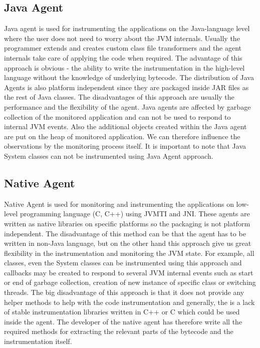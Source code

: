\subsection{Java Agent}
Java agent is used for instrumenting the applications on the Java-language level where the user does not need to worry about the JVM internals. Usually the programmer extends and creates custom class file transformers and the agent internals take care of applying the code when required. The advantage of this approach is obvious - the ability to write the instrumentation in the high-level language without the knowledge of underlying bytecode. The distribution of Java Agents is also platform independent since they are packaged inside JAR files as the rest of Java classes. The disadvantages of this approach are usually the performance and the flexibility of the agent. Java agents are affected by garbage collection of the monitored application and can not be used to respond to internal JVM events. Also the additional objects created within the Java agent are put on the heap of monitored application. We can therefore influence the observations by the monitoring process itself. It is important to note that Java System classes can not be instrumented using Java Agent approach.
\subsection{Native Agent}
Native Agent is used for monitoring and instrumenting the applications on low-level programming language (C, C++) using JVMTI and JNI. These agents are written as native libraries on specific platforms so the packaging is not platform independent. The disadvantage of this method can be that the agent has to be written in non-Java language, but on the other hand this approach give us great flexibility in the instrumentation and monitoring the JVM state. For example, all classes, even the System classes can be instrumented using this approach and callbacks may be created to respond to several JVM internal events such as start or end of garbage collection, creation of new instance of specific class or switching threads. The big disadvantage of this approach is that it does not provide any helper methods to help with the code instrumentation and generally, the is a lack of stable instrumentation libraries written in C++ or C which could be used inside the agent. The developer of the native agent has therefore write all the required methods for extracting the relevant parts of the bytecode and the instrumentation itself.


